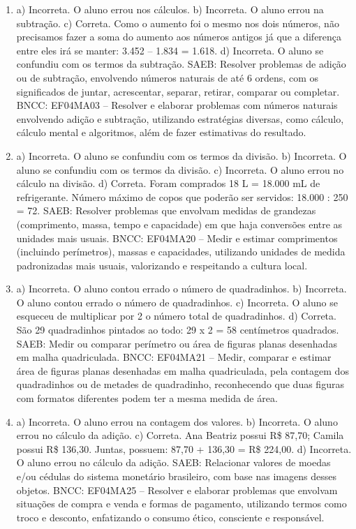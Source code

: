 \begin{enumerate}
\item
a) Incorreta. O aluno errou nos cálculos.
b) Incorreta. O aluno errou na subtração.
c) Correta. Como o aumento foi o mesmo nos dois números, não
precisamos fazer a soma do aumento aos números antigos já que a
diferença entre eles irá se manter: 3.452 -- 1.834 = 1.618.
d) Incorreta. O aluno se confundiu com os termos da subtração.
SAEB: Resolver problemas de adição ou de subtração, envolvendo números
naturais de até 6 ordens, com os significados de juntar, acrescentar,
separar, retirar, comparar ou completar.
BNCC: EF04MA03 -- Resolver e elaborar problemas com números naturais envolvendo adição e subtração,
utilizando estratégias diversas, como cálculo, cálculo mental e algoritmos, além de fazer estimativas
do resultado.

\item
a) Incorreta. O aluno se confundiu com os termos da divisão.
b) Incorreta. O aluno se confundiu com os termos da divisão.
c) Incorreta. O aluno errou no cálculo na divisão.
d) Correta. Foram comprados 18 L = 18.000 mL de refrigerante.
Número máximo de copos que poderão ser servidos: 18.000 : 250 = 72.
SAEB: Resolver problemas que envolvam medidas de grandezas
(comprimento, massa, tempo e capacidade) em que haja conversões entre as
unidades mais usuais.
BNCC: EF04MA20 -- Medir e estimar comprimentos (incluindo perímetros), massas e capacidades, utilizando
unidades de medida padronizadas mais usuais, valorizando e respeitando a cultura local.

\item
a) Incorreta. O aluno contou errado o número de quadradinhos.
b) Incorreta. O aluno contou errado o número de quadradinhos.
c) Incorreta. O aluno se esqueceu de multiplicar por 2 o número total de quadradinhos.
d) Correta. São 29 quadradinhos pintados ao todo: 29 x 2 = 58 centímetros quadrados.
SAEB: Medir ou comparar perímetro ou área de figuras planas
desenhadas em malha quadriculada.
BNCC: EF04MA21 -- Medir, comparar e estimar área de figuras planas desenhadas em malha quadriculada,
pela contagem dos quadradinhos ou de metades de quadradinho, reconhecendo que duas figuras
com formatos diferentes podem ter a mesma medida de área.

\item
a) Incorreta. O aluno errou na contagem dos valores.
b) Incorreta. O aluno errou no cálculo da adição.
c) Correta. Ana Beatriz possui R\$ 87,70; Camila possui R\$ 136,30. Juntas, possuem: 87,70 + 136,30 = R\$ 224,00.
d) Incorreta. O aluno errou no cálculo da adição.
SAEB: Relacionar valores de moedas e/ou cédulas do sistema
monetário brasileiro, com base nas imagens desses objetos.
BNCC: EF04MA25 -- Resolver e elaborar problemas que envolvam situações de compra e venda e formas
de pagamento, utilizando termos como troco e desconto, enfatizando o consumo ético, consciente e
responsável.


\end{enumerate}
